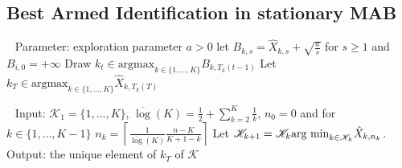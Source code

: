\subsection*{Best Armed Identification in stationary MAB}
\begin{algo}
\label{algo:ucbe}
\begin{algorithmic}
\STATE	$\ \ $
\STATE	Parameter: exploration parameter $a>0$
	\STATE	let $B_{k,s} = \hat{X}_{k,s}+\sqrt{\frac{a}{s}}$ for $s\geqslant 1$ and $B_{i,0} = +\infty$
\ENDFOR
{}
	\STATE	Draw $k_t\in \text{argmax}_{k \in \{1,\dots,K\}}B_{k,T_k(t-1)}$
\ENDFOR
\STATE	Let $k_T \in \text{argmax}_{k\in\{1,\dots,K\}}\hat{X}_{k,T_k(T)}$
\end{algorithmic}
\end{algo}

\begin{algo}
\label{algo:SR}
\begin{algorithmic}
\STATE	$\ \ $
\STATE Input: $\mathscr{K}_1=\{1,\dots,K\}$, $\overline{\log}(K) = \frac{1}{2}+\sum_{k=2}^K \frac{1}{k}$, $n_0 = 0$ and for $k\in \{1,\dots,K-1\}$
\STATE	$n_k = \left\lceil{\frac{1}{\overline{\log}(K)}\frac{n-K}{K+1-k}}\right\rceil $
    	\STATE	Let $\mathscr{K}_{k+1} = \mathscr{K}_k\/ \text{arg min}_{k\in \mathscr{K}_k} \hat{X}_{k,n_k}$.
    \ENDFOR
\ENDFOR
\STATE Output: the unique element of $k_T$ of $\mathscr{K}$
\end{algorithmic}
\end{algo}
